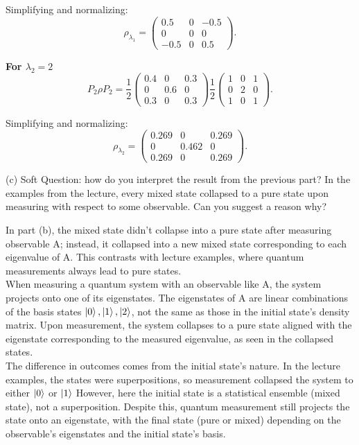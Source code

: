 \documentclass{article}
\theoremstyle{plain}
\numberwithin{thm}{section}
\theoremstyle{definition}
\begin{document}
\begin{enumerate}
    Simplifying and normalizing:
    \[
    \rho_{\lambda_1} = 
    \begin{pmatrix}
    0.5 & 0 & -0.5 \\
    0 & 0 & 0 \\
    -0.5 & 0 & 0.5
    \end{pmatrix}.
    \]
    
    \textbf{For $\lambda_2 = 2$}  
    \[
    P_2 \rho P_2 = \frac{1}{2}
    \begin{pmatrix}
    0.4 & 0 & 0.3 \\
    0 & 0.6 & 0 \\
    0.3 & 0 & 0.3
    \end{pmatrix}
    \frac{1}{2}
    \begin{pmatrix}
    1 & 0 & 1 \\
    0 & 2 & 0 \\
    1 & 0 & 1
    \end{pmatrix}.
    \]
    
    Simplifying and normalizing:
    \[
    \rho_{\lambda_2} = 
    \begin{pmatrix}
    0.269 & 0 & 0.269 \\
    0 & 0.462 & 0 \\
    0.269 & 0 & 0.269
    \end{pmatrix}.
    \]

    (c) Soft Question: how do you interpret the result from the previous part? In the examples from the lecture, every mixed state collapsed to a pure state upon measuring with respect to some observable. Can you suggest a reason why?

    In part (b), the mixed state didn't collapse into a pure state after measuring observable A; instead, it collapsed into a new mixed state corresponding to each eigenvalue of A. This contrasts with lecture examples, where quantum measurements always lead to pure states.\\ 
    
    When measuring a quantum system with an observable like A, the system projects onto one of its eigenstates. The eigenstates of A are linear combinations of the basis states $\ket{0}, \ket{1}, \ket{2}$, not the same as those in the initial state’s density matrix. Upon measurement, the system collapses to a pure state aligned with the eigenstate corresponding to the measured eigenvalue, as seen in the collapsed states.\\
    
    The difference in outcomes comes from the initial state’s nature. In the lecture examples, the states were superpositions, so measurement collapsed the system to either $\ket{0}$ or $\ket{1}$ However, here the initial state is a statistical ensemble (mixed state), not a superposition. Despite this, quantum measurement still projects the state onto an eigenstate, with the final state (pure or mixed) depending on the observable’s eigenstates and the initial state’s basis.


\end{enumerate}
\end{document}
